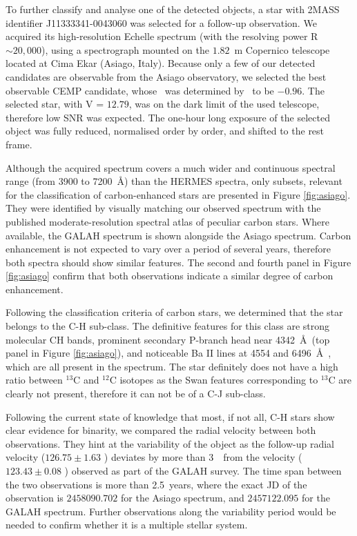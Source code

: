 To further classify and analyse one of the detected objects, a star with 2MASS identifier J11333341-0043060 was selected for a follow-up observation. We acquired its high-resolution Echelle spectrum (with the resolving power R $\sim 20,000$), using a spectrograph mounted on the $1.82$~m Copernico telescope located at Cima Ekar (Asiago, Italy). Because only a few of our detected candidates are observable from the Asiago observatory, we selected the best observable CEMP candidate, whose \Feh\ was determined by \TC\ to be $-0.96$. The selected star, with V = $12.79$, was on the dark limit of the used telescope, therefore low SNR was expected. The one-hour long exposure of the selected object was fully reduced, normalised order by order, and shifted to the rest frame.

Although the acquired spectrum covers a much wider and continuous spectral range (from 3900 to 7200~\AA) than the HERMES spectra, only subsets, relevant for the classification of carbon-enhanced stars are presented in Figure \ref{fig:asiago}. They were identified by visually matching our observed spectrum with the published moderate-resolution spectral atlas \cite{1996ApJS..105..419B} of peculiar carbon stars. Where available, the GALAH spectrum is shown alongside the Asiago spectrum. Carbon enhancement is not expected to vary over a period of several years, therefore both spectra should show similar features. The second and fourth panel in Figure \ref{fig:asiago} confirm that both observations indicate a similar degree of carbon enhancement.

Following the classification criteria of carbon stars, we determined that the star belongs to the C-H sub-class. The definitive features for this class are strong molecular CH bands, prominent secondary P-branch head near 4342~\AA\ (top panel in Figure \ref{fig:asiago}), and noticeable Ba II lines at 4554 and 6496~\AA\ \cite{2018ApJS..234...31L}, which are all present in the spectrum. The star definitely does not have a high ratio between $^{13}$C and $^{12}$C isotopes as the Swan features corresponding to $^{13}$C are clearly not present, therefore it can not be of a C-J sub-class.

Following the current state of knowledge \cite{1990ApJ...352..709M, 2016AA...586A.158J, 2016ApJ...826...85S} that most, if not all, C-H stars show clear evidence for binarity, we compared the radial velocity between both observations. They hint at the variability of the object as the follow-up radial velocity ($126.75 \pm 1.63$ \kms) deviates by more than $3$~\kms\ from the velocity ($123.43 \pm 0.08$ \kms) observed as part of the GALAH survey. The time span between the two observations is more than 2.5~years, where the exact JD of the observation is $2458090.702$ for the Asiago spectrum, and $2457122.095$ for the GALAH spectrum. Further observations along the variability period would be needed to confirm whether it is a multiple stellar system.

